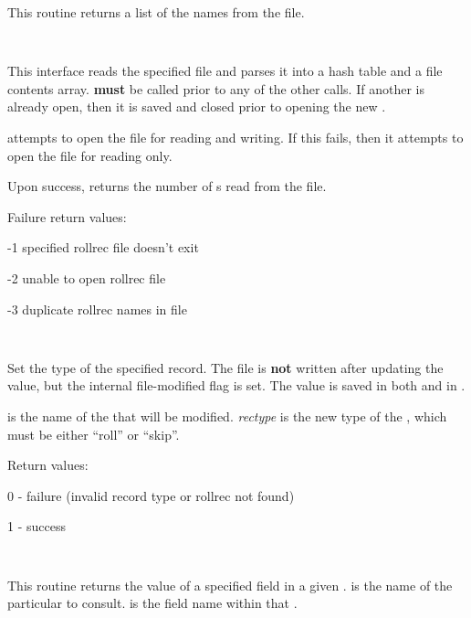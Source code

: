\begin{description}
This routine returns a list of the  names from the file.

\item {}\verb" "

This interface reads the specified  file and parses it into a
 hash table and a file contents array.  
{\bf must} be called prior to any of the other  calls.  If
another  is already open, then it is saved and closed prior to
opening the new .

 attempts to open the  file for reading
and writing.  If this fails, then it attempts to open the file for reading
only.

Upon success,  returns the number of s
read from the file.

Failure return values:

\begin{description}
\item -1 specified rollrec file doesn't exit
\item -2 unable to open rollrec file
\item -3 duplicate rollrec names in file
\end{description}

\item {}\verb" "

Set the type of the specified  record.  The file is {\bf not}
written after updating the value, but the internal file-modified flag is set.
The value is saved in both  and in \var{\@rollreclines}.

 is the name of the  that will be modified.
{\it rectype} is the new type of the , which must be either
``roll'' or ``skip''.

Return values:

\begin{description}
\item 0 - failure (invalid record type or rollrec not found)
\item 1 - success
\end{description}

\item {}\verb" "

This routine returns the value of a specified field in a given
.   is the name of the particular
 to consult.   is the field name within
that .


\end{description}
